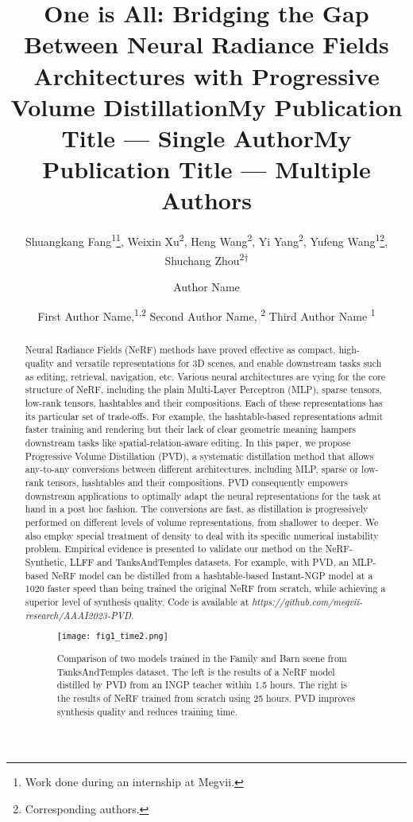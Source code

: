 \documentclass[letterpaper]{article} \usepackage{aaai23}  \usepackage{times}  \usepackage{helvet}  \usepackage{courier}  \usepackage[hyphens]{url}  \usepackage{graphicx} \urlstyle{rm} \def\UrlFont{\rm}  \usepackage{natbib}  \usepackage{caption} \frenchspacing  \setlength{\pdfpagewidth}{8.5in}  \setlength{\pdfpageheight}{11in}  \usepackage{multirow}
\title{One is All: Bridging the Gap Between Neural Radiance Fields Architectures with Progressive Volume Distillation}
\author{
Shuangkang Fang\textsuperscript{\rm 1}\thanks{Work done during an internship at Megvii.},
    Weixin Xu\textsuperscript{\rm 2},
    Heng Wang\textsuperscript{\rm 2},
    Yi Yang\textsuperscript{\rm 2},
    Yufeng Wang\textsuperscript{\rm 1}\thanks{Corresponding authors.},
    Shuchang Zhou\textsuperscript{\rm 2†}
}
\title{My Publication Title --- Single Author}
\author {
    Author Name
}
\title{My Publication Title --- Multiple Authors}
\author {
First Author Name,\textsuperscript{\rm 1,\rm 2}
    Second Author Name, \textsuperscript{\rm 2}
    Third Author Name \textsuperscript{\rm 1}
}
\begin{document}
\maketitle



\begin{abstract}
Neural Radiance Fields (NeRF) methods have proved effective as compact, high-quality and versatile representations for 3D scenes, and enable downstream tasks such as editing, retrieval, navigation, etc.  
Various neural architectures are vying for the core structure of NeRF, including the plain Multi-Layer Perceptron (MLP), sparse tensors, low-rank tensors, hashtables and their compositions. 
Each of these representations has its particular set of trade-offs. For example, the hashtable-based representations admit faster training and rendering but their lack of clear geometric meaning hampers downstream tasks like spatial-relation-aware editing. 
In this paper, we propose Progressive Volume Distillation (PVD), a systematic distillation method that allows any-to-any conversions between different architectures, including MLP, sparse or low-rank tensors, hashtables and their compositions. PVD consequently empowers downstream applications to optimally adapt the neural representations for the task at hand in a post hoc fashion. 
The conversions are fast, as distillation is progressively performed on different levels of volume representations, from shallower to deeper. We also employ special treatment of density to deal with its specific numerical instability problem.
Empirical evidence is presented to validate our method on the NeRF-Synthetic, LLFF and TanksAndTemples datasets. For example, with PVD, an MLP-based NeRF model can be distilled from a hashtable-based Instant-NGP model at a 1020 faster speed than being trained the original NeRF from scratch, while achieving a superior level of synthesis quality. Code is available at \textit{https://github.com/megvii-research/AAAI2023-PVD}.


\begin{figure}[ht]
\centering
\texttt{[image: fig1\_time2.png]} \caption{Comparison of two models trained in the Family and Barn scene from TanksAndTemples dataset. The left is the results of a NeRF model distilled by PVD from an INGP teacher within 1.5 hours. The right is the results of NeRF trained from scratch using 25 hours. PVD improves synthesis quality and reduces training time.}
\label{fig-tank}
\end{figure}



\end{abstract}
\end{document}
